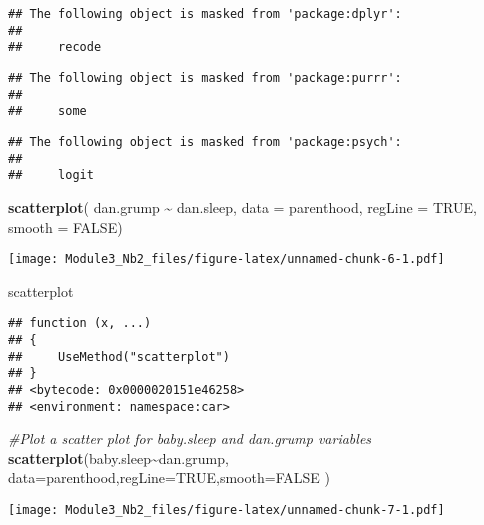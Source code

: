\documentclass[
]{article}
\newenvironment{Shaded}{\begin{snugshade}}{\end{snugshade}}
\newcommand{\AttributeTok}[1]{\textcolor[rgb]{0.13,0.29,0.53}{#1}}
\newcommand{\CommentTok}[1]{\textcolor[rgb]{0.56,0.35,0.01}{\textit{#1}}}
\newcommand{\ConstantTok}[1]{\textcolor[rgb]{0.56,0.35,0.01}{#1}}
\newcommand{\FunctionTok}[1]{\textcolor[rgb]{0.13,0.29,0.53}{\textbf{#1}}}
\newcommand{\NormalTok}[1]{#1}
\newcommand{\SpecialCharTok}[1]{\textcolor[rgb]{0.81,0.36,0.00}{\textbf{#1}}}
\begin{document}
\begin{verbatim}
## The following object is masked from 'package:dplyr':
## 
##     recode
\end{verbatim}

\begin{verbatim}
## The following object is masked from 'package:purrr':
## 
##     some
\end{verbatim}

\begin{verbatim}
## The following object is masked from 'package:psych':
## 
##     logit
\end{verbatim}

\begin{Shaded}
\begin{Highlighting}[]
\FunctionTok{scatterplot}\NormalTok{( dan.grump }\SpecialCharTok{\textasciitilde{}}\NormalTok{ dan.sleep, }\AttributeTok{data =}\NormalTok{ parenthood, }\AttributeTok{regLine =} \ConstantTok{TRUE}\NormalTok{, }\AttributeTok{smooth =} \ConstantTok{FALSE}\NormalTok{)}
\end{Highlighting}
\end{Shaded}

\texttt{[image: Module3\_Nb2\_files/figure-latex/unnamed-chunk-6-1.pdf]}

\begin{Shaded}
\begin{Highlighting}[]
\NormalTok{scatterplot}
\end{Highlighting}
\end{Shaded}

\begin{verbatim}
## function (x, ...) 
## {
##     UseMethod("scatterplot")
## }
## <bytecode: 0x0000020151e46258>
## <environment: namespace:car>
\end{verbatim}

\begin{Shaded}
\begin{Highlighting}[]
\CommentTok{\#Plot a scatter plot for baby.sleep and dan.grump variables}
\FunctionTok{scatterplot}\NormalTok{(baby.sleep}\SpecialCharTok{\textasciitilde{}}\NormalTok{dan.grump, }\AttributeTok{data=}\NormalTok{parenthood,}\AttributeTok{regLine=}\ConstantTok{TRUE}\NormalTok{,}\AttributeTok{smooth=}\ConstantTok{FALSE}\NormalTok{ )}
\end{Highlighting}
\end{Shaded}

\texttt{[image: Module3\_Nb2\_files/figure-latex/unnamed-chunk-7-1.pdf]}
\end{document}
